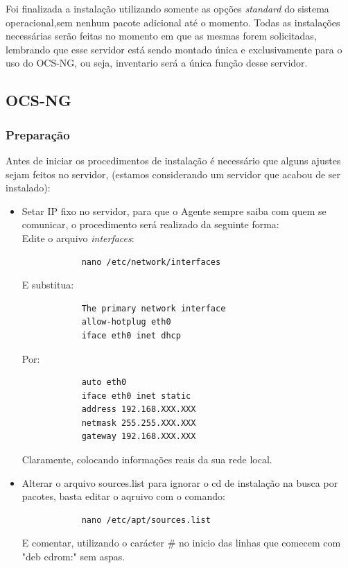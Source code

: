 \documentclass[
               12pt,             %
               a4paper,          %
               chapter=TITLE,    %
               section=TITLE,    %
               english,
               brazil            
]{article}
\begin{document}
Foi finalizada a instalação utilizando somente as opções \textit{standard} do sistema operacional,sem nenhum pacote adicional até o momento. Todas as instalações necessárias serão feitas no momento em que as mesmas forem solicitadas, lembrando que esse servidor está sendo montado única e exclusivamente para o uso do OCS-NG, ou seja, inventario será a única função desse servidor.\\


\subsection{OCS-NG}

\subsubsection{Preparação}

Antes de iniciar os procedimentos de instalação é necessário que alguns ajustes sejam feitos no servidor, (estamos considerando um servidor que acabou de ser instalado):\\

\pagebreak

\begin{itemize}

\item Setar IP fixo no servidor, para que o Agente sempre saiba com quem se comunicar, o procedimento será realizado da seguinte forma:\\
		Edite o arquivo \textit{interfaces}:
		
		\begin{verbatim}
			nano /etc/network/interfaces
		\end{verbatim}		 

		E substitua:
		
		\begin{verbatim}
			The primary network interface
			allow-hotplug eth0
			iface eth0 inet dhcp
		\end{verbatim}		 
		
		Por: 
		
		\begin{verbatim}
			auto eth0
			iface eth0 inet static
			address 192.168.XXX.XXX
			netmask 255.255.XXX.XXX
			gateway 192.168.XXX.XXX
		\end{verbatim}	

		Claramente, colocando informações reais da sua rede local.
		

\item Alterar o arquivo sources.list para ignorar o cd de instalação na busca por pacotes, basta editar o aqruivo com o comando: 

		\begin{verbatim}
			nano /etc/apt/sources.list
		\end{verbatim}	

E comentar, utilizando o carácter \# no inicio das linhas que comecem com "deb cdrom:" sem aspas.

		
\end{itemize}
\end{document}
